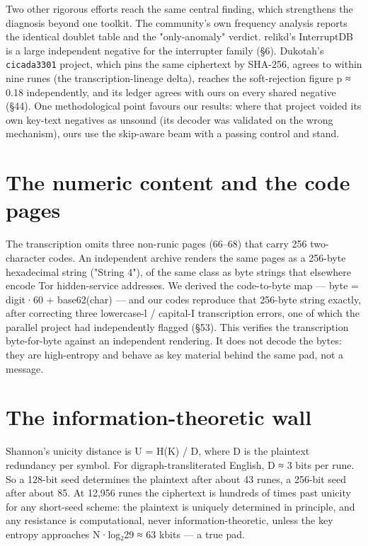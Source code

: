 \documentclass[11pt]{article}
\begin{document}
Two other rigorous efforts reach the same central finding, which strengthens the diagnosis beyond one toolkit. The community's own frequency analysis reports the identical doublet table and the "only-anomaly" verdict. relikd's InterruptDB is a large independent negative for the interrupter family (§6). Dukotah's \texttt{cicada3301} project, which pins the same ciphertext by SHA-256, agrees to within nine runes (the transcription-lineage delta), reaches the soft-rejection figure p ≈ 0.18 independently, and its ledger agrees with ours on every shared negative (§44). One methodological point favours our results: where that project voided its own key-text negatives as unsound (its decoder was validated on the wrong mechanism), ours use the skip-aware beam with a passing control and stand.


\section{The numeric content and the code pages}

The transcription omits three non-runic pages (66–68) that carry 256 two-character codes. An independent archive renders the same pages as a 256-byte hexadecimal string ("String 4"), of the same class as byte strings that elsewhere encode Tor hidden-service addresses. We derived the code-to-byte map — byte = digit·60 + base62(char) — and our codes reproduce that 256-byte string exactly, after correcting three lowercase-l / capital-I transcription errors, one of which the parallel project had independently flagged (§53). This verifies the transcription byte-for-byte against an independent rendering. It does not decode the bytes: they are high-entropy and behave as key material behind the same pad, not a message.


\section{The information-theoretic wall}

Shannon's unicity distance is U = H(K) / D, where D is the plaintext redundancy per symbol. For digraph-transliterated English, D ≈ 3 bits per rune. So a 128-bit seed determines the plaintext after about 43 runes, a 256-bit seed after about 85. At 12,956 runes the ciphertext is hundreds of times past unicity for any short-seed scheme: the plaintext is uniquely determined in principle, and any resistance is computational, never information-theoretic, unless the key entropy approaches N·log₂29 ≈ 63 kbits — a true pad.
\end{document}
